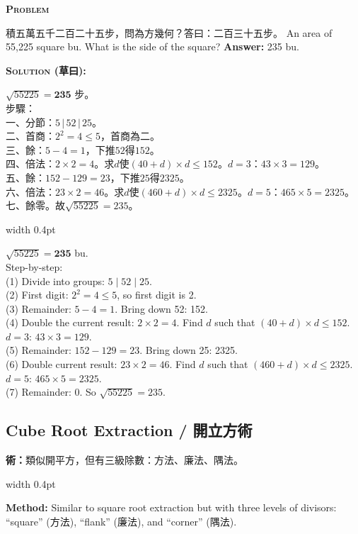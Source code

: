 \documentclass[10pt,a4paper]{article}
\newcommand{\zh}[1]{{\CJKfamily{notocjksc}#1}}
\newcommand{\bilingual}[2]{%
  \par\smallskip\noindent%
  \begin{minipage}[t]{0.47\textwidth}%
    \RaggedRight\small #1%
  \end{minipage}%
  \hfill\vrule width 0.4pt\hfill%
  \begin{minipage}[t]{0.47\textwidth}%
    \RaggedRight\small #2%
  \end{minipage}%
  \par\smallskip%
}
\newenvironment{biproblem}[2][]{%
  \par\smallskip\vspace{1.5ex}%
  \noindent\textbf{\textcolor{problemframe}{\textsc{Problem} #1}}\par\smallskip
  \bgroup\small%
}{%
  \egroup\par\smallskip
}
\newenvironment{bisolution}{%
  \par\smallskip\noindent\textbf{\textcolor{notecolor}{\textsc{Solution} (草曰):}}\par\smallskip\itshape\small%
}{%
  \par\smallskip\normalfont%
}
\begin{document}
\begin{biproblem}
\bilingual{
  \zh{積五萬五千二百二十五步，問為方幾何？答曰：二百三十五步。}
}{%
  An area of 55,225 square bu. What is the side of the square? \textbf{Answer:} 235 bu.
}
\end{biproblem}

\begin{bisolution}
\bilingual{
  $\sqrt{55225} = \textbf{235}$ 步。\\
  步驟：\\
  一、分節：$5\,|\,52\,|\,25$。\\
  二、首商：$2^2 = 4 \leq 5$，首商為二。\\
  三、餘：$5 - 4 = 1$，下推$52$得$152$。\\
  四、倍法：$2 \times 2 = 4$。求$d$使$(40+d) \times d \leq 152$。$d=3$：$43 \times 3 = 129$。\\
  五、餘：$152 - 129 = 23$，下推$25$得$2325$。\\
  六、倍法：$23 \times 2 = 46$。求$d$使$(460+d) \times d \leq 2325$。$d=5$：$465 \times 5 = 2325$。\\
  七、餘零。故$\sqrt{55225} = 235$。
}{%
  $\sqrt{55225} = \textbf{235}$ bu.\\
  Step-by-step:\\
  (1) Divide into groups: $5 \mid 52 \mid 25$.\\
  (2) First digit: $2^2 = 4 \leq 5$, so first digit is 2.\\
  (3) Remainder: $5 - 4 = 1$. Bring down 52: 152.\\
  (4) Double the current result: $2 \times 2 = 4$. Find $d$ such that $(40 + d) \times d \leq 152$. $d = 3$: $43 \times 3 = 129$.\\
  (5) Remainder: $152 - 129 = 23$. Bring down 25: 2325.\\
  (6) Double current result: $23 \times 2 = 46$. Find $d$ such that $(460 + d) \times d \leq 2325$. $d = 5$: $465 \times 5 = 2325$.\\
  (7) Remainder: 0. So $\sqrt{55225} = 235$.
}
\end{bisolution}

\subsection{Cube Root Extraction / 開立方術}

\bilingual{
  \textbf{術：}類似開平方，但有三級除數：\zh{方法}、\zh{廉法}、\zh{隅法}。
}{%
  \textbf{Method:} Similar to square root extraction but with three levels of divisors: ``square'' (\zh{方法}), ``flank'' (\zh{廉法}), and ``corner'' (\zh{隅法}).
}
\end{document}
